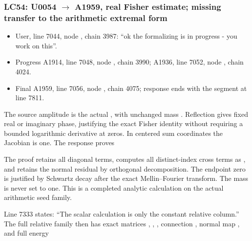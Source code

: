 \subsubsection{\texorpdfstring{LC54: U0054
\allowbreak{}\ensuremath{→}\allowbreak{} A1959, real Fisher estimate;
missing transfer to the arithmetic extremal
form}{LC54: U0054  A1959, real Fisher estimate; missing transfer to the arithmetic extremal form}}\label{TranscriptLedgerStage:lc54-u0054-a1959-real-fisher-estimate-missing-transfer-to-the-arithmetic-extremal-form}

\begin{itemize}
\tightlist
\item
  User, line 7044, node
  \protect{}, chain 3987: ``ok
  the formalizing is in progress - you work on this''.
\item
  Progress A1914, line 7048, node
  \protect{}, chain 3990;
  A1936, line 7052, node
  \protect{}, chain 4024.
\item
  Final A1959, line 7056, node
  \protect{}, chain 4075;
  response ends with the segment at line 7811.
\end{itemize}

The source amplitude is the actual
\protect{}, with unchanged mass
\protect{}. Reflection gives fixed real or imaginary
phase, justifying the exact Fisher identity without requiring a bounded
logarithmic derivative at zeros. In centered sum coordinates the
Jacobian is one. The response proves


The proof retains all diagonal terms, computes all distinct-index cross
terms as \protect{}, and
retains the normal residual by orthogonal decomposition. The endpoint
zero is justified by Schwartz decay after the exact Mellin--Fourier
transform. The mass is never set to one. This is a completed analytic
calculation on the actual arithmetic seed family.

Line 7333 states: ``The scalar calculation is only the constant relative
column.'' The full relative family then has exact matrices
\protect{}, \protect{},
\protect{}, connection
\protect{}, normal map
\protect{}, and full energy

